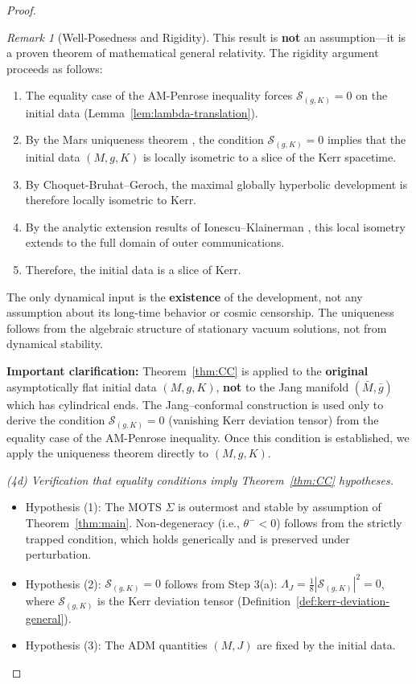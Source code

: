 \documentclass[12pt]{article}
\theoremstyle{plain}
\theoremstyle{definition}
\theoremstyle{remark}
\newtheorem{remark}[theorem]{Remark}
\newcommand{\bg}{\bar{g}}
\newcommand{\bM}{\bar{M}}
\begin{document}
\begin{proof}
\begin{remark}[Well-Posedness and Rigidity]
This result is \textbf{not} an assumption---it is a proven theorem of mathematical general relativity. The rigidity argument proceeds as follows:
\begin{enumerate}
    \item The equality case of the AM-Penrose inequality forces $\mathcal{S}_{(g,K)} = 0$ on the initial data (Lemma~\ref{lem:lambda-translation}).
    \item By the Mars uniqueness theorem \cite{mars1999, mars2009}, the condition $\mathcal{S}_{(g,K)} = 0$ implies that the initial data $(M, g, K)$ is locally isometric to a slice of the Kerr spacetime.
    \item By Choquet-Bruhat--Geroch, the maximal globally hyperbolic development is therefore locally isometric to Kerr.
    \item By the analytic extension results of Ionescu--Klainerman \cite{ionescuklainerman2009}, this local isometry extends to the full domain of outer communications.
    \item Therefore, the initial data is a slice of Kerr.
\end{enumerate}

The only dynamical input is the \textbf{existence} of the development, not any assumption about its long-time behavior or cosmic censorship. The uniqueness follows from the algebraic structure of stationary vacuum solutions, not from dynamical stability.
\end{remark}

\textbf{Important clarification:} Theorem~\ref{thm:CC} is applied to the \textbf{original} asymptotically flat initial data $(M, g, K)$, \textbf{not} to the Jang manifold $(\bM, \bg)$ which has cylindrical ends. The Jang--conformal construction is used only to derive the condition $\mathcal{S}_{(g,K)} = 0$ (vanishing Kerr deviation tensor) from the equality case of the AM-Penrose inequality. Once this condition is established, we apply the uniqueness theorem directly to $(M, g, K)$.

\textit{(4d) Verification that equality conditions imply Theorem~\ref{thm:CC} hypotheses.}
\begin{itemize}
    \item Hypothesis (1): The MOTS $\Sigma$ is outermost and stable by assumption of Theorem~\ref{thm:main}. Non-degeneracy (i.e., $\theta^- < 0$) follows from the strictly trapped condition, which holds generically and is preserved under perturbation.
    \item Hypothesis (2): $\mathcal{S}_{(g,K)} = 0$ follows from Step 3(a): $\Lambda_J = \frac{1}{8}|\mathcal{S}_{(g,K)}|^2 = 0$, where $\mathcal{S}_{(g,K)}$ is the Kerr deviation tensor (Definition~\ref{def:kerr-deviation-general}).
    \item Hypothesis (3): The ADM quantities $(M, J)$ are fixed by the initial data.
\end{itemize}


\end{proof}
\end{document}
